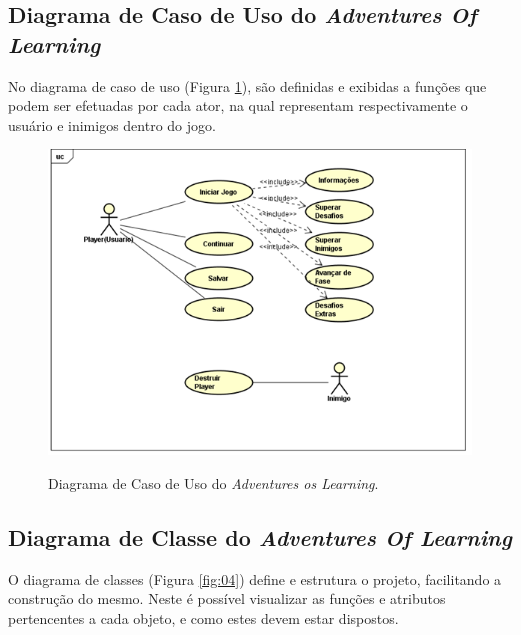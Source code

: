 \documentclass[
	12pt,				%
    oneside,			%
	a4paper,			%
	english,			%
	french,				%
	spanish,			%
	brazil,				%
	]{abntex2}
\begin{document}
		\subsection{Diagrama de Caso de Uso do \textit{Adventures Of Learning}}
		
			No diagrama de caso de uso (Figura \ref{fig:03}), são definidas e exibidas a funções que podem ser efetuadas por cada ator, na qual representam respectivamente o usuário e inimigos dentro do jogo.
			
			\begin{figure}[H]
				\caption{Diagrama de Caso de Uso do \textit{Adventures os Learning}.}
				\centering
				\includegraphics[width=0.7\linewidth]{Imagens/03}
				\label{fig:03}
			\end{figure}
		
		\subsection{Diagrama de Classe do \textit{Adventures Of Learning}}
			
			O diagrama de classes (Figura \ref{fig:04}) define e estrutura o projeto, facilitando a construção do mesmo. Neste é possível visualizar as funções e atributos pertencentes a cada objeto, e como estes devem estar dispostos.
			
\end{document}
